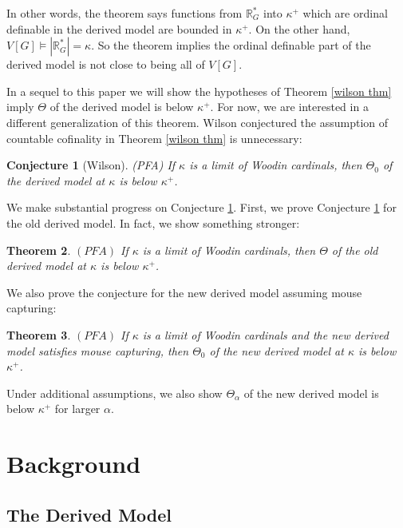 \documentclass[12pt]{article}
\newtheorem{theorem}{Theorem}[section]
\newtheorem{conjecture}[theorem]{Conjecture}
\newcommand\R{\mathbb{R}}
\begin{document}
In other words, the theorem says functions from $\R^*_G$ into $\kappa^+$ which are ordinal definable in the derived model are bounded in $\kappa^+$. On the other hand, $V[G] \models |\R^*_G| = \kappa$. So the theorem implies the ordinal definable part of the derived model is not close to being all of $V[G]$.

In a sequel to this paper we will show the hypotheses of Theorem \ref{wilson thm} imply $\Theta$ of the derived model is below $\kappa^+$. For now, we are interested in a different generalization of this theorem. Wilson conjectured the assumption of countable cofinality in Theorem \ref{wilson thm} is unnecessary:

\begin{conjecture}[Wilson]
\label{first part of conjecture}
    (PFA) If $\kappa$ is a limit of Woodin cardinals, then $\Theta_0$ of the derived model at $\kappa$ is below $\kappa^+$.
\end{conjecture}

We make substantial progress on Conjecture \ref{first part of conjecture}. First, we prove Conjecture \ref{first part of conjecture} for the old derived model. In fact, we show something stronger:

\begin{theorem}
\label{intro thm for old}
    $(PFA)$ If $\kappa$ is a limit of Woodin cardinals, then $\Theta$ of the old derived model at $\kappa$ is below $\kappa^+$.
\end{theorem}

We also prove the conjecture for the new derived model assuming mouse capturing:

\begin{theorem}
\label{intro thm for new}
    $(PFA)$ If $\kappa$ is a limit of Woodin cardinals and the new derived model satisfies mouse capturing, then $\Theta_0$ of the new derived model at $\kappa$ is below $\kappa^+$.
\end{theorem}

Under additional assumptions, we also show $\Theta_\alpha$ of the new derived model is below $\kappa^+$ for larger $\alpha$.


\section{Background}
\subsection{The Derived Model}
\end{document}
